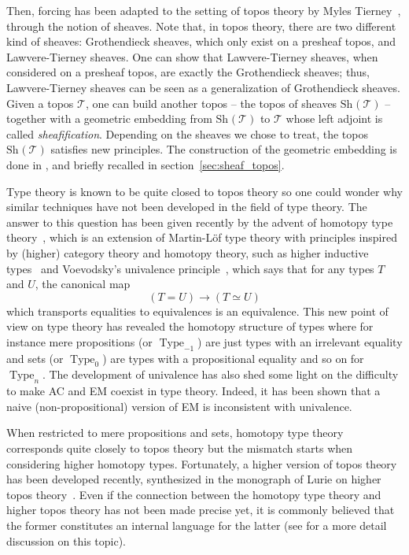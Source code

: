 \documentclass[notfinal]{jfrarticle}
\DeclareMathOperator{\Type}{Type}
\newcommand \Sh[1] {\mathrm{Sh}_{#1}}
\begin{document}
Then, forcing has been adapted to the setting of topos theory by Myles
Tierney~\cite{tierney1972}, through the notion of sheaves.  Note that,
in topos theory, there are two different kind of sheaves: Grothendieck
sheaves, which only exist on a presheaf topos, and Lawvere-Tierney
sheaves. One can show that Lawvere-Tierney sheaves, when considered on
a presheaf topos, are exactly the Grothendieck sheaves; thus,
Lawvere-Tierney sheaves can be seen as a generalization of
Grothendieck sheaves.  Given a topos $\mathcal T$, one can build
another topos -- the topos of sheaves $\Sh{}(\mathcal T)$ -- together
with a geometric embedding from $\Sh{}(\mathcal T)$ to $\mathcal T$
whose left adjoint is
called {\em sheafification}.  Depending on the sheaves we chose to treat,
the topos $\Sh{}(\mathcal T)$ satisfies new principles. The
construction of the geometric embedding is done in \cite[Section
V.3]{maclanemoerdijk}, and briefly recalled in
section~\ref{sec:sheaf_topos}.

Type theory is known to be quite closed to topos theory so one could
wonder why similar techniques have not been developed in the field of
type theory.
%
The answer to this question has been given recently by the advent of
homotopy type theory~\cite{hottbook}, which is an extension of
Martin-Löf type theory with principles inspired by (higher) category
theory and homotopy theory, such as higher inductive
types~\cite{lumsdaine2013higher,hottbook} and
Voevodsky's univalence principle~\cite{kapulkin2012simplicial}, which
says that for any types $T$ and $U$, the canonical map 
$$
(T = U) \to (T \simeq U)
$$ 
%
which transports equalities to equivalences is an equivalence.
%
This new point of view on type theory has revealed the homotopy
structure of types where for instance mere propositions (or
$\Type_{-1}$) are just types with an
irrelevant equality and sets (or $\Type_{0}$) are types
with a propositional equality and so on for $\Type_{n}$.
%
The development of univalence has also shed some light on the
difficulty to make AC and EM coexist in type theory. Indeed, it
has been shown that a naive (non-propositional) version of EM is
inconsistent with univalence.

When restricted to mere propositions and sets, homotopy type
theory corresponds quite closely to topos theory but the mismatch
starts when considering higher homotopy types.
%
Fortunately, a higher version of topos theory has been developed
recently, synthesized in the monograph of Lurie on
higher topos theory~\cite{lurie}. Even if the connection between the
homotopy type theory and higher topos theory has not been made precise
yet, it is commonly believed that the former constitutes an internal
language for the latter (see \cite{shulman2015} for a more detail
discussion on this topic). 
\end{document}

